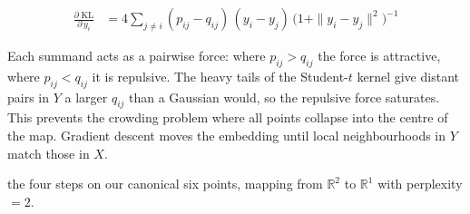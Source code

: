 \begin{align*}
    \frac{\partial\;\text{KL}}{\partial\, y_i}
        &= 4 \sum_{j \neq i}
           (p_{ij} - q_{ij})\,(y_i - y_j)\,
           \bigl(1 + \|y_i - y_j\|^2\bigr)^{-1}
\end{align*}

Each summand acts as a pairwise force: where $p_{ij} > q_{ij}$ the force 
is attractive, where $p_{ij} < q_{ij}$ it is repulsive. 
The heavy tails of the Student-$t$ kernel give distant pairs in $Y$ a larger 
$q_{ij}$ than a Gaussian would, so the repulsive force saturates. 
This prevents the crowding problem where all points collapse into the centre of the map.
Gradient descent moves the embedding until local neighbourhoods in $Y$ match those in $X$.

 the four steps on our canonical six points,
mapping from $\mathbb{R}^2$ to $\mathbb{R}^1$ with perplexity${=}2$.

\begin{marginfigure}
\centering
{}
\caption{The canonical six points (again)).
Cluster~A: $x_1{=}(1,2)$, $x_2{=}(2,3)$, $x_3{=}(3,1)$.
Cluster~B: $x_4{=}(6,8)$, $x_5{=}(8,7)$, $x_6{=}(8,9)$.}
\label{fig:tsne_canonical_ref}
\end{marginfigure}

